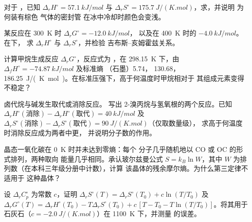 \begin{exercise}[$\star\star$]\label{exo:b2:reaction-free-energy:6}
对于 ，已知 $\Delta_r H^\circ = \qty{57.1}{kJ/mol}$ 与
$\Delta_r S^\circ = \qty{175.7}{J/(K.mol)}$，求，并说明
为何装有棕色  气体的密封管
在冰中冷却时颜色会变浅。
\end{exercise}

\begin{exercise}[$\star\star$]\label{exo:b2:reaction-free-energy:7}
某反应在 \qty{300}{K} 时 $\Delta_r G^\circ = \qty{-12.0}{kJ/mol}$，
以及在 \qty{400}{K} 时的 $\qty{-4.0}{kJ/mol}$。在下，
求 $\Delta_r H^\circ$ 与 $\Delta_r S^\circ$，并检验
吉布斯–亥姆霍兹关系。
\end{exercise}

\begin{exercise}[$\star\star$]\label{exo:b2:reaction-free-energy:8}
计算甲烷生成反应 $\Delta_r G^\circ$，反应式为 ，在 \qty{298.15}{K} 下，由 $\Delta_f H^\circ = \qty{-74.87}{kJ/mol}$
及标准熵 （石墨）5.74， 130.68，
\qty{186.25}{J/(K.mol)}。在标准压强下，高于何温度时甲烷相对于
其组成元素变得不稳定？
\end{exercise}

\begin{exercise}[$\star\star$]\label{exo:b2:reaction-free-energy:9}
卤代烷与碱发生取代或消除反应。
写出 2-溴丙烷与氢氧根的两个反应。已知 $\Delta_r
H^\circ(\text{消除}) - \Delta_r H^\circ(\text{取代}) =
\qty{+40}{kJ/mol}$ 及 $\Delta_r S^\circ(\text{消除}) - \Delta_r
S^\circ(\text{取代}) = \qty{+90}{J/(K.mol)}$（仅取数量级），
求高于何温度时消除反应成为两者中更，
并说明分子数的作用。
\end{exercise}

\begin{exercise}[$\star\star\star$]\label{exo:b2:reaction-free-energy:10}
晶态一氧化碳在 \qty{0}{K} 时并未达到零熵：每个
分子几乎随机地以 CO 或 OC 的形式排列，两种取向
能量几乎相同。承认玻尔兹曼公式 $S = k_B\ln W$，其中
$W$ 为排列数（在本科三年级分册中计数），计算
该晶体的残余摩尔熵。为什么第三定律不适用于
这种晶体？
\end{exercise}

\begin{exercise}[$\star\star\star$]\label{exo:b2:reaction-free-energy:11}
设 $\Delta_r C^\circ_p$ 为常数 $c$，证明
$\Delta_r S^\circ(T) = \Delta_r S^\circ(T_0) + c\ln(T/T_0)$ 及
$\Delta_r G^\circ(T) = \Delta_r H^\circ(T_0) - T\Delta_r S^\circ(T_0) +
c\,[T - T_0 - T\ln(T/T_0)]$。将其用于石灰石（$c =
\qty{-2.0}{J/(K.mol)}$）在 \qty{1100}{K} 下，并测量
的误差。
\end{exercise}

